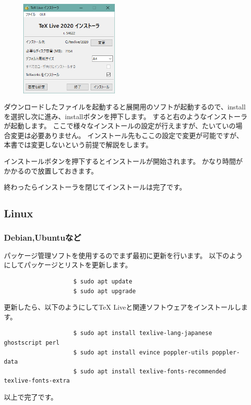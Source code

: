 			\begin{figure}
				\centering
				\includegraphics[width=5cm]{TeXlive-installer2.png}
			\end{figure}

			ダウンロードしたファイルを起動すると展開用のソフトが起動するので、installを選択し次に進み、installボタンを押下します。
			すると右のようなインストーラが起動します。
			ここで様々なインストールの設定が行えますが、たいていの場合変更は必要ありません。
			インストール先もここの設定で変更が可能ですが、本書では変更しないという前提で解説をします。

			インストールボタンを押下するとインストールが開始されます。
			かなり時間がかかるので放置しておきます。

			終わったらインストーラを閉じてインストールは完了です。

		\subsection{Linux}
			\subsubsection{Debian,Ubuntuなど}
				パッケージ管理ソフトを使用するのでまず最初に更新を行います。
				以下のようにしてパッケージとリストを更新します。
				\begin{mdframed}[linecolor=black,linewidth=0.5pt]
					\begin{verbatim}
					$ sudo apt update
					$ sudo apt upgrade
					\end{verbatim}
				\end{mdframed}
				更新したら、以下のようにしてTeX Liveと関連ソフトウェアをインストールします。
				\begin{mdframed}[linecolor=black,linewidth=0.5pt]
					\begin{verbatim}
					$ sudo apt install texlive-lang-japanese ghostscript perl
					$ sudo apt install evince poppler-utils poppler-data
					$ sudo apt install texlive-fonts-recommended texlive-fonts-extra
					\end{verbatim}
				\end{mdframed}
				以上で完了です。

